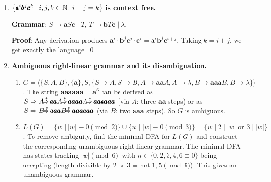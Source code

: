 \begin{enumerate}[{9.}1. ]
\begin{enumerate}
\item \textbf{Fix}: First transform $G_1$ and $G_2$ so that $\lambda$ is not derivable from their respective start symbols (or handle it explicitly). If $\lambda \in L(G_i)$, add explicit productions:
\[
Z \to S_1 S_2 \mid S_1 \mid S_2 \mid \lambda \quad \text{(appropriate subset based on whether } \lambda \in L(G_i)\text{)}
\]
Specifically: add $Z \to S_2$ if $\lambda \in L(G_1)$; add $Z \to S_1$ if $\lambda \in L(G_2)$; add $Z \to \lambda$ if $\lambda \in L(G_1) \cap L(G_2)$.

\item \textbf{Proof}: $w \in L(G^*_{\text{corrected}})$ iff $Z \DRightarrow w$ iff $w = uv$ with $u \in L(G_1)$ and $v \in L(G_2)$ (considering the $\lambda$ cases via the added productions) iff $w \in L(G_1)\cdot L(G_2)$. \qed
\end{enumerate}

\item \textbf{$\{\pmb{a}^i\pmb{b}^j\pmb{c}^k \mid i,j,k \in \mathbb{N},\ i+j=k\}$ is context free.}

\textbf{Grammar}: $S \to \pmb{a}S\pmb{c} \mid T$, $T \to \pmb{b}T\pmb{c} \mid \lambda$.

\textbf{Proof}: Any derivation produces $\pmb{a}^i \cdot \pmb{b}^j\pmb{c}^j \cdot \pmb{c}^i = \pmb{a}^i\pmb{b}^j\pmb{c}^{i+j}$. Taking $k = i+j$, we get exactly the language. \qed

\item \textbf{Ambiguous right-linear grammar and its disambiguation.}

\begin{enumerate}
\item $G = \langle\{S,A,B\},\{\pmb{a}\},S,\{S\to A, S\to B, A\to\pmb{aa}A, A\to\lambda, B\to\pmb{aaa}B, B\to\lambda\}\rangle$.
The string $\pmb{aaaaaa} = \pmb{a}^6$ can be derived as $S\Rightarrow A \DRightarrow \pmb{aa}A\DRightarrow \pmb{aaaa}A\DRightarrow \pmb{aaaaaa}$ (via $A$: three $\pmb{aa}$ steps) or as $S \Rightarrow B \DRightarrow \pmb{aaa}B\DRightarrow\pmb{aaaaaa}$ (via $B$: two $\pmb{aaa}$ steps). So $G$ is ambiguous.

\item $L(G) = \{w \mid |w| \equiv 0 \pmod{2}\} \cup \{w \mid |w| \equiv 0 \pmod{3}\} = \{w \mid 2 \mid |w| \text{ or } 3 \mid |w|\}$.
To remove ambiguity, find the minimal DFA for $L(G)$ and construct the corresponding unambiguous right-linear grammar. The minimal DFA has states tracking $|w| \pmod{6}$, with $n \in \{0,2,3,4,6\equiv 0\}$ being accepting (length divisible by 2 or 3 = not $1,5 \pmod{6}$). This gives an unambiguous grammar.
\end{enumerate}


\end{enumerate}

